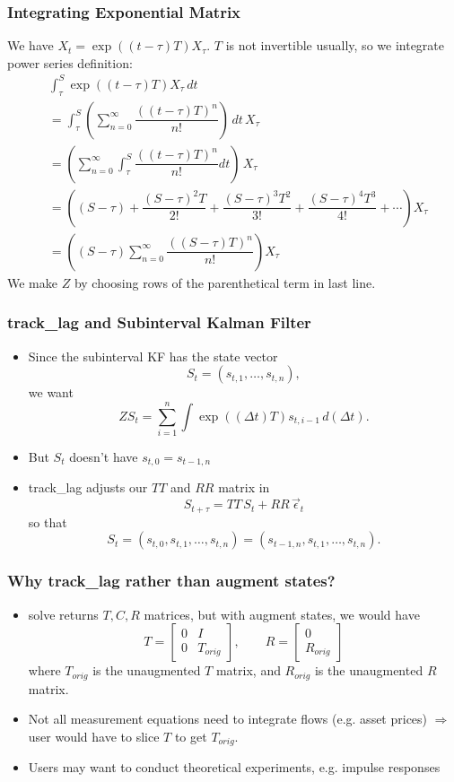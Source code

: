 \documentclass{beamer}
\newcommand{\RA}{\Rightarrow}
\begin{document}
\begin{frame}
  \frametitle{Integrating Exponential Matrix}
We have $X_t = \exp((t - \tau)T)X_{\tau}$. $T$ is not invertible usually, so we integrate power series definition:
\begin{align*}
& \int_{\tau}^S \exp((t-\tau)T) X_\tau\, dt \\
& = \int_{\tau}^S \left(\sum_{ n = 0}^\infty \dfrac{((t-\tau)T)^n}{n!}\right)\, dt \, X_\tau\\
& = \left(\sum_{ n = 0}^\infty \int_\tau^S \dfrac{((t-\tau)T)^n}{n!}dt\right)\,X_\tau \\
& = \left((S-\tau) +\dfrac{(S-\tau)^2 T}{2!} + \dfrac{(S-\tau)^3T^2}{3!} + \dfrac{(S-\tau)^4T^3}{4!} + \cdots\right)X_\tau\\
& = \left((S-\tau)\sum_{n = 0}^\infty \dfrac{((S-\tau)T)^n}{n!}\right)X_\tau
\end{align*}
We make $Z$ by choosing rows of the parenthetical term in last line.
\end{frame}

\begin{frame}
  \frametitle{track\_lag and Subinterval Kalman Filter}
  \begin{itemize}
  \item Since the subinterval KF has the state vector
\[S_t = (s_{t,1},\dots, s_{t,n}),\]
we want
\[ ZS_{t} = \sum_{i = 1}^n \int \exp( (\Delta t) T)s_{t,i-1}\, d(\Delta t).\]
\item But $S_t$ doesn't have $s_{t, 0} = s_{t-1,n}$
\item track\_lag adjusts our $TT$ and $RR$ matrix in
\[S_{t+\tau} = TT\, S_t + RR\,\vec{\epsilon}_t \]
so that
\[ S_t = (s_{t,0},s_{t,1},\dots, s_{t,n}) = (s_{t-1,n}, s_{t,1},\dots, s_{t,n}). \]
  \end{itemize}
\end{frame}

\begin{frame}
  \frametitle{Why track\_lag rather than augment states?}
  \begin{itemize}
    \item solve returns $T,C,R$ matrices, but with augment states, we would have
\[T = \begin{bmatrix}
0 & I \\
0 & T_{orig}
\end{bmatrix}, \quad\quad R =
\begin{bmatrix}
  0 \\
R_{orig}
\end{bmatrix}
\]
where $T_{orig}$ is the unaugmented $T$ matrix, and $R_{orig}$ is the unaugmented $R$ matrix.
    \item Not all measurement equations need to integrate flows (e.g. asset prices) $\RA$ user would have to slice $T$ to get $T_{orig}$.
    \item Users may want to conduct theoretical experiments, e.g. impulse responses
  \end{itemize}
\end{frame}
\end{document}
